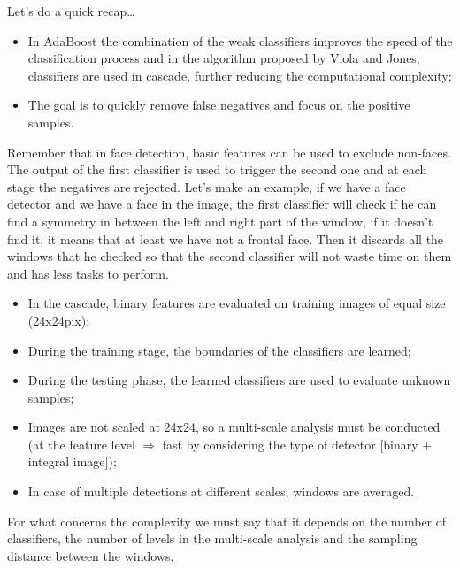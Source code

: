 Let's do a quick recap\dots
\begin{itemize}
    \item In AdaBoost the combination of the weak classifiers improves the speed of the classification process and in the algorithm proposed by Viola and Jones, classifiers are used
in cascade, further reducing the computational complexity;
    \item The goal is to quickly remove false negatives and focus on the positive samples.
\end{itemize}
Remember that in face detection, basic features can be used to exclude non-faces.
The output of the first classifier is used to trigger the second one and at each stage the negatives are rejected.
Let's make an example, if we have a face detector and we have a face in the image, the first classifier will check if he can find a symmetry in between the left and right part of the window, if it doesn't find it, it means that at least we have not a frontal face. Then it discards all the windows that he checked so that the second classifier will not waste time on them and has less tasks to perform.
\begin{itemize}
    \item In the cascade, binary features are evaluated on training images of equal size (24x24pix);
    \item During the training stage, the boundaries of the classifiers are learned;
    \item During the testing phase, the learned classifiers are used to evaluate unknown samples;
    \item Images are not scaled at 24x24, so a multi-scale analysis must be conducted (at the feature level $\Rightarrow$ fast by considering the type of detector [binary + integral image]);
    \item In case of multiple detections at different scales, windows are averaged.
\end{itemize}
For what concerns the complexity we must say that it depends on the number of classifiers, the number of levels in the multi-scale analysis and the sampling distance between the windows.
